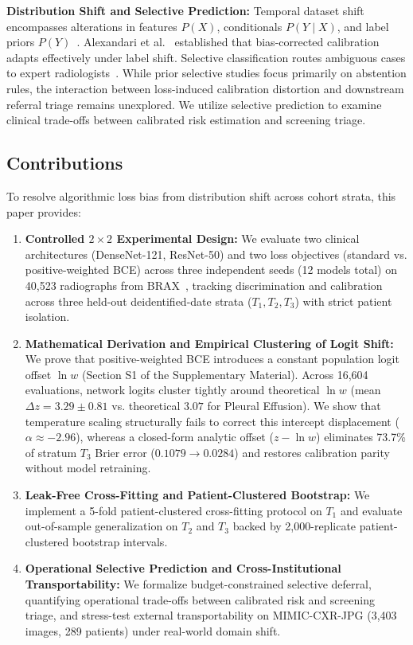\documentclass[preprint,12pt]{elsarticle}
\begin{document}
\textbf{Distribution Shift and Selective Prediction:} Temporal dataset shift encompasses alterations in features $P(X)$, conditionals $P(Y \mid X)$, and label priors $P(Y)$~\cite{finlayson2021clinician, davis2020detection}. Alexandari et al.~\cite{alexandari2020maximum} established that bias-corrected calibration adapts effectively under label shift. Selective classification routes ambiguous cases to expert radiologists~\cite{geifman2017selective, kompa2021second, aperstein2026knowing}. While prior selective studies focus primarily on abstention rules, the interaction between loss-induced calibration distortion and downstream referral triage remains unexplored. We utilize selective prediction to examine clinical trade-offs between calibrated risk estimation and screening triage.

\subsection{Contributions}
To resolve algorithmic loss bias from distribution shift across cohort strata, this paper provides:
\begin{enumerate}
    \item \textbf{Controlled $2 \times 2$ Experimental Design:} We evaluate two clinical architectures (DenseNet-121, ResNet-50) and two loss objectives (standard vs. positive-weighted BCE) across three independent seeds (12 models total) on 40,523 radiographs from BRAX~\cite{reis2022brax}, tracking discrimination and calibration across three held-out deidentified-date strata ($T_1, T_2, T_3$) with strict patient isolation.
    \item \textbf{Mathematical Derivation and Empirical Clustering of Logit Shift:} We prove that positive-weighted BCE introduces a constant population logit offset $\ln w$ (Section S1 of the Supplementary Material). Across 16,604 evaluations, network logits cluster tightly around theoretical $\ln w$ (mean $\Delta z = 3.29 \pm 0.81$ vs. theoretical $3.07$ for Pleural Effusion). We show that temperature scaling structurally fails to correct this intercept displacement ($\alpha \approx -2.96$), whereas a closed-form analytic offset ($z - \ln w$) eliminates 73.7\% of stratum $T_3$ Brier error ($0.1079 \to 0.0284$) and restores calibration parity without model retraining.
    \item \textbf{Leak-Free Cross-Fitting and Patient-Clustered Bootstrap:} We implement a 5-fold patient-clustered cross-fitting protocol on $T_1$ and evaluate out-of-sample generalization on $T_2$ and $T_3$ backed by 2,000-replicate patient-clustered bootstrap intervals.
    \item \textbf{Operational Selective Prediction and Cross-Institutional Transportability:} We formalize budget-constrained selective deferral, quantifying operational trade-offs between calibrated risk and screening triage, and stress-test external transportability on MIMIC-CXR-JPG (3,403 images, 289 patients) under real-world domain shift.
\end{enumerate}
\end{document}
